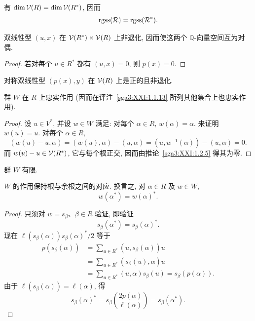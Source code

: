 \begin{corollary}\label{sga3:XXI:1.2.4}
有 \(\dim\mathcal{V}(R)=\dim\mathcal{V}(R^\ast)\), 因而
\[
 \operatorname{rgss}(\mathcal{R})=\operatorname{rgss}(\mathcal{R}^\ast).
\]
\end{corollary}

\begin{corollary}\label{sga3:XXI:1.2.5}
双线性型 \((u,x)\) 在 \(\mathcal{V}(R^\ast)\times\mathcal{V}(R)\) 上非退化, 因而使这两个 \(\mathbb Q\)-向量空间互为对偶.
\end{corollary}
\begin{proof}
若对每个 \(u\in R^\ast\) 都有 \((u,x)=0\), 则 \(p(x)=0\).
\end{proof}

\begin{corollary}\label{sga3:XXI:1.2.6}
对称双线性型 \((p(x),y)\) 在 \(\mathcal{V}(R)\) 上是正的且非退化.
\end{corollary}

\begin{corollary}\label{sga3:XXI:1.2.7}
群 \(W\) 在 \(R\) 上忠实作用 (因而在评注~\ref{sga3:XXI:1.1.13} 所列其他集合上也忠实作用).
\end{corollary}
\begin{proof}
设 \(u\in V^\ast\), 并设 \(w\in W\) 满足: 对每个 \(\alpha\in R\), \(w(\alpha)=\alpha\). 来证明 \(w(u)=u\). 对每个 \(\alpha\in R\),
\[
 (w(u)-u,\alpha)
 =(w(u),\alpha)-(u,\alpha)
 =(u,w^{-1}(\alpha))-(u,\alpha)=0.
\]
而 \(w(u)-u\in\mathcal{V}(R^\ast)\), 它与每个根正交, 因而由推论~\ref{sga3:XXI:1.2.5} 得其为零.
\end{proof}

\begin{corollary}\label{sga3:XXI:1.2.8}
群 \(W\) 有限.
\end{corollary}

\begin{proposition}\label{sga3:XXI:1.2.9}
\(W\) 的作用保持根与余根之间的对应. 换言之, 对 \(\alpha\in R\) 及 \(w\in W\),
\[
 w(\alpha^\ast)=w(\alpha)^\ast.
\]
\end{proposition}
\begin{proof}
只须对 \(w=s_\beta\)、\(\beta\in R\) 验证, 即验证
\[
 s_\beta(\alpha^\ast)=s_\beta(\alpha)^\ast.
\]
现在 \(\ell(s_\beta(\alpha))s_\beta(\alpha)^\ast/2\) 等于
\begin{align*}
 p(s_\beta(\alpha))
 &=\sum_{u\in R^\ast}(u,s_\beta(\alpha))u\\
 &=\sum_{u\in R^\ast}(s_\beta(u),\alpha)u\\
 &=\sum_{u\in R^\ast}(u,\alpha)s_\beta(u)
  =s_\beta(p(\alpha)).
\end{align*}
由于 \(\ell(s_\beta(\alpha))=\ell(\alpha)\), 得
\[
 s_\beta(\alpha)^\ast
 =s_\beta\!\left(\frac{2p(\alpha)}{\ell(\alpha)}\right)
 =s_\beta(\alpha^\ast).
\]
\end{proof}

